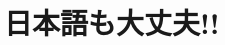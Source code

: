 \documentclass[a4paper]{bxjsarticle}
\numberwithin{equation}{section}
\numberwithin{figure}{section}
\numberwithin{table}{section}
\begin{document}

\section{日本語も大丈夫!!}

\end{document}
